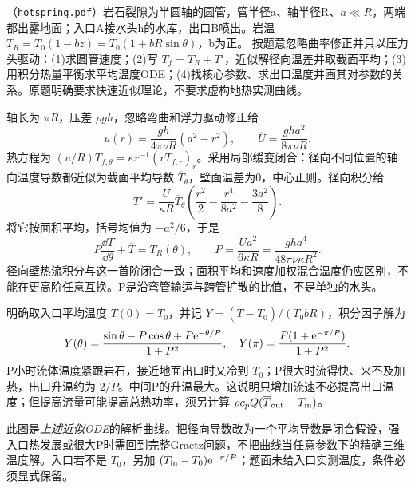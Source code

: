 \begin{exercise}\label{task:fluid-hotspring}
（\texttt{hotspring.pdf}）岩石裂隙为半圆轴的圆管，管半径a、轴半径R、$a\ll R$，两端都出露地面；入口A接水头h的水库，出口B喷出。岩温 $T_R=T_0(1-bz)=T_0(1+bR\sin\theta)$，b为正。
按题意忽略曲率修正并只以压力头驱动：(1)求圆管速度；(2)写 $T_f=T_R+T'$，近似解径向温差并取截面平均；(3)用积分热量平衡求平均温度ODE；(4)找核心参数、求出口温度并画其对参数的关系。原题明确要求快速近似理论，不要求虚构地热实测曲线。
\end{exercise}
\begin{solution}
轴长为 $\pi R$，压差 $\rho gh$，忽略弯曲和浮力驱动修正给
\[
 u(r)=\frac{gh}{4\pi\nu R}(a^2-r^2),\qquad
 \overline U=\frac{gh a^2}{8\pi\nu R}.
\]
热方程为 $(u/R)T_{f,\theta}=\kappa r^{-1}(rT_{f,r})_r$。采用局部缓变闭合：径向不同位置的轴向温度导数都近似为截面平均导数 $\overline T_\theta$，壁面温差为0，中心正则。径向积分给
\[
 T'=\frac{\overline U}{\kappa R}\overline T_\theta
       \left(\frac{r^2}{2}-\frac{r^4}{8a^2}-\frac{3a^2}{8}\right).
\]
将它按面积平均，括号均值为 $-a^2/6$，于是
\[
 P\frac{\dd\overline T}{\dd\theta}+\overline T=T_R(\theta),\qquad
 P=\frac{\overline U a^2}{6\kappa R}
  =\frac{gh a^4}{48\pi\nu\kappa R^2}.
\]
径向壁热流积分与这一首阶闭合一致；面积平均和速度加权混合温度仍应区别，不能在更高阶任意互换。P是沿弯管输运与跨管扩散的比值，不是单独的水头。

明确取入口平均温度 $\overline T(0)=T_0$，并记 $Y=(\overline T-T_0)/(T_0bR)$，积分因子解为
\[
 Y(\theta)=\frac{\sin\theta-P\cos\theta+P\mathrm e^{-\theta/P}}{1+P^2},\quad
 Y(\pi)=\frac{P(1+\mathrm e^{-\pi/P})}{1+P^2}.
\]
P小时流体温度紧跟岩石，接近地面出口时又冷到 $T_0$；P很大时流得快、来不及加热，出口升温约为 $2/P$。中间P的升温最大。这说明只增加流速不必提高出口温度；但提高流量可能提高总热功率，须另计算 $\rho c_pQ(\overline T_{\rm out}-T_{\mathrm{in}})$。
\begin{center}\end{center}
此图是\emph{上述近似ODE}的解析曲线。把径向导数改为一个平均导数是闭合假设，强入口热发展或很大P时需回到完整Graetz问题，不把曲线当任意参数下的精确三维温度解。入口若不是 $T_0$，另加 $(T_{\mathrm{in}}-T_0)\mathrm e^{-\pi/P}$；题面未给入口实测温度，条件必须显式保留。
\end{solution}
